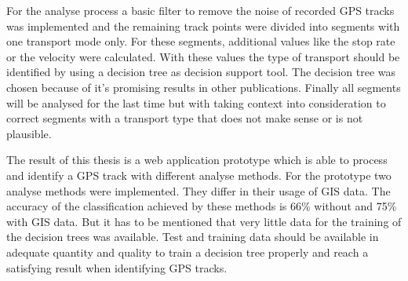 For the analyse process a basic filter to remove the noise of recorded GPS tracks was implemented and the remaining track points were divided into segments with one transport mode only. For these segments, additional values like the stop rate or the velocity were calculated. With these values the type of transport should be identified by using a decision tree as decision support tool. The decision tree was chosen because of it's promising results in other publications. Finally all segments will be analysed for the last time but with taking context into consideration to correct segments with a transport type that does not make sense or is not plausible.

The result of this thesis is a web application prototype which is able to process and identify a GPS track with different analyse methods. For the prototype two analyse methods were implemented. They differ in their usage of GIS data. The accuracy of the classification achieved by these methods is 66\% without and 75\% with GIS data. But it has to be mentioned that very little data for the training of the decision trees was available. Test and training data should be available in adequate quantity and quality to train a decision tree properly and reach a satisfying result when identifying GPS tracks.

\afterpage{\blankpage}
\newpage